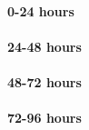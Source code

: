 \documentclass{ametsoc}
\begin{document}
\paragraph{0-24 hours}
\paragraph{24-48 hours}
\paragraph{48-72 hours}
\paragraph{72-96 hours}







\end{document}
